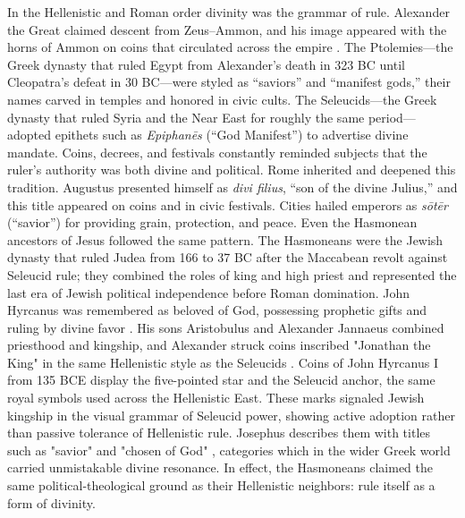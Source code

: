 In the Hellenistic and Roman order divinity was the grammar of rule.
Alexander the Great claimed descent from Zeus--Ammon, and his image appeared with the horns of Ammon on coins that circulated across the empire \cite[27]{plutarch:lives}.
The Ptolemies---the Greek dynasty that ruled Egypt from Alexander's death in 323 BC until Cleopatra's defeat in 30 BC---were styled as ``saviors'' and ``manifest gods,'' their names carved in temples and honored in civic cults.
The Seleucids---the Greek dynasty that ruled Syria and the Near East for roughly the same period---adopted epithets such as \emph{Epiphanēs} (``God Manifest'') to advertise divine mandate.
Coins, decrees, and festivals constantly reminded subjects that the ruler’s authority was both divine and political.
Rome inherited and deepened this tradition.
Augustus presented himself as \emph{divi filius}, “son of the divine Julius,” and this title appeared on coins and in civic festivals.
Cities hailed emperors as \emph{sōtēr} (“savior”) for providing grain, protection, and peace.
Even the Hasmonean ancestors of Jesus followed the same pattern.
The Hasmoneans were the Jewish dynasty that ruled Judea from 166 to 37 BC after the Maccabean revolt against Seleucid rule; they combined the roles of king and high priest and represented the last era of Jewish political independence before Roman domination.
John Hyrcanus was remembered as beloved of God, possessing prophetic gifts and ruling by divine favor \cite[13.299--300]{josephus:ant}.
His sons Aristobulus and Alexander Jannaeus combined priesthood and kingship, and Alexander struck coins inscribed "Jonathan the King" in the same Hellenistic style as the Seleucids \cite[13.320]{josephus:ant}.
Coins of John Hyrcanus I from 135 BCE display the five-pointed star and the Seleucid anchor, the same royal symbols used across the Hellenistic East.
These marks signaled Jewish kingship in the visual grammar of Seleucid power, showing active adoption rather than passive tolerance of Hellenistic rule.
Josephus describes them with titles such as "savior" and "chosen of God" \cite{josephus:ant}, categories which in the wider Greek world carried unmistakable divine resonance.
In effect, the Hasmoneans claimed the same political-theological ground as their Hellenistic neighbors: rule itself as a form of divinity.

